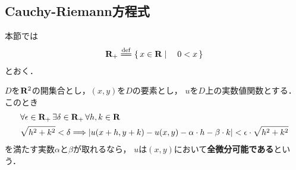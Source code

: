 \subsection{Cauchy-Riemann方程式}
	本節では
	\begin{align}
		\R_+ \defeq \Set{x \in \R}{0 < x}
	\end{align}
	とおく．
	
	\begin{screen}
		\begin{dfn}[全微分可能]\label{def:totally_differentiability}
			$D$を$\mathbf{R}^2$の開集合とし，$(x,y)$を$D$の要素とし，
			$u$を$D$上の実数値関数とする．このとき
			\begin{align}
				&\forall \epsilon \in \mathbf{R}_+\, \exists \delta \in \mathbf{R}_+\, \forall h,k \in \mathbf{R}\, \\
				&\sqrt{h^2 + k^2} < \delta \Longrightarrow
				\left|u(x+h,y+k) - u(x,y) - \alpha \cdot h - \beta \cdot k\right| 
				< \epsilon \cdot \sqrt{h^2 + k^2}
				\label{fom:def_totally_differentiability}
			\end{align}
			を満たす実数$\alpha$と$\beta$が取れるなら，
			$u$は$(x,y)$において{\bf 全微分可能である}という．
		\end{dfn}
	\end{screen}
	
